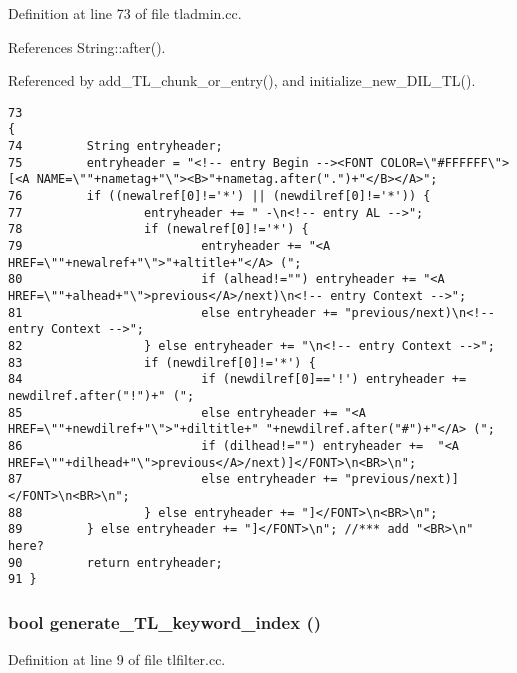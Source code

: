 Definition at line 73 of file tladmin.cc.

References String::after().

Referenced by add\_\-TL\_\-chunk\_\-or\_\-entry(), and initialize\_\-new\_\-DIL\_\-TL().



\footnotesize\begin{verbatim}73                                                                                                                                                    {
74         String entryheader;
75         entryheader = "<!-- entry Begin --><FONT COLOR=\"#FFFFFF\">[<A NAME=\""+nametag+"\"><B>"+nametag.after(".")+"</B></A>";
76         if ((newalref[0]!='*') || (newdilref[0]!='*')) {
77                 entryheader += " -\n<!-- entry AL -->";
78                 if (newalref[0]!='*') {
79                         entryheader += "<A HREF=\""+newalref+"\">"+altitle+"</A> (";
80                         if (alhead!="") entryheader += "<A HREF=\""+alhead+"\">previous</A>/next)\n<!-- entry Context -->";
81                         else entryheader += "previous/next)\n<!-- entry Context -->";
82                 } else entryheader += "\n<!-- entry Context -->";
83                 if (newdilref[0]!='*') {
84                         if (newdilref[0]=='!') entryheader += newdilref.after("!")+" (";
85                         else entryheader += "<A HREF=\""+newdilref+"\">"+diltitle+" "+newdilref.after("#")+"</A> (";
86                         if (dilhead!="") entryheader +=  "<A HREF=\""+dilhead+"\">previous</A>/next)]</FONT>\n<BR>\n";
87                         else entryheader += "previous/next)]</FONT>\n<BR>\n";
88                 } else entryheader += "]</FONT>\n<BR>\n";
89         } else entryheader += "]</FONT>\n"; //*** add "<BR>\n" here?
90         return entryheader;
91 }
\end{verbatim}\normalsize 
{}
\subsubsection{\setlength{\rightskip}{0pt plus 5cm}bool generate\_\-TL\_\-keyword\_\-index ()}\label{dil2al_8hh_a343}




Definition at line 9 of file tlfilter.cc.



